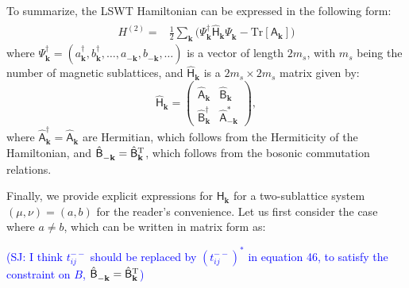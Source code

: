 \documentclass[aps, prx, nofootinbib, superscriptaddress]{revtex4-2}
\newcommand{\kvec}{\mathbf{k}}
\newcommand{\Tr}{\mathrm{Tr}}
\begin{document}
To summarize, the LSWT Hamiltonian can be expressed in the following form:
\begin{align}
    H^{(2)} 
    = & \frac{1}{2}\sum_{\kvec} \Big(     
        \Psi_{\kvec}^\dagger \hat{\mathsf{H}}_{\kvec}^{\phantom{\dagger}} \Psi_{\kvec}^{\phantom{\dagger}} 
    - \Tr [\mathsf{A}_{\kvec}] \Big)
\end{align}
where $\Psi^\dagger_{\kvec}=\left( a^\dagger_{\kvec}, b^\dagger_{\kvec},\dots, a^{\phantom \dagger}_{-\kvec},b^{\phantom \dagger}_{-\kvec},\dots\right)$ is a vector of length $2 m_s$, with $m_s$ being the number of magnetic sublattices, and $\hat{\mathsf{H}}_{\kvec}$ is a $2m_s\times 2m_s$ matrix given by:
\begin{equation}
    \hat{\mathsf{H}}_{\kvec} = 
    \begin{pmatrix}
        \hat{\mathsf{A}}^{\phantom \dagger}_{\kvec} &  \hat{\mathsf{B}}^{\phantom \dagger}_{\kvec}\\[0.5ex] 
        \hat{\mathsf{B}}^\dagger_{\kvec}  & \hat{\mathsf{A}}^*_{-\kvec}
    \end{pmatrix},
\end{equation}
where $\hat{\mathsf{A}}^{\dagger}_{\kvec} = \hat{\mathsf{A}}^{\phantom \dagger}_{\kvec}$ are Hermitian, which follows from the Hermiticity of the Hamiltonian, and $\hat{\mathsf{B}}^{\phantom *}_{-\kvec} = \hat{\mathsf{B}}^{\rm T}_{\kvec}$, which follows from the bosonic commutation relations. 

Finally, we provide explicit expressions for $\mathsf{H}_{\kvec}$ for a two-sublattice system $(\mu, \nu) = (a, b)$ for the reader's convenience.
Let us first consider the case where $a \neq b$, which can be written in matrix form as: 

\textcolor{blue}{(SJ: I think $t^{--}_{ij}$ should be replaced by $(t^{--}_{ij})^{*}$ in equation 46, to satisfy the constraint on $B$, $\hat{\mathsf{B}}^{\phantom *}_{-\kvec} = \hat{\mathsf{B}}^{\rm T}_{\kvec} $) }
\end{document}
